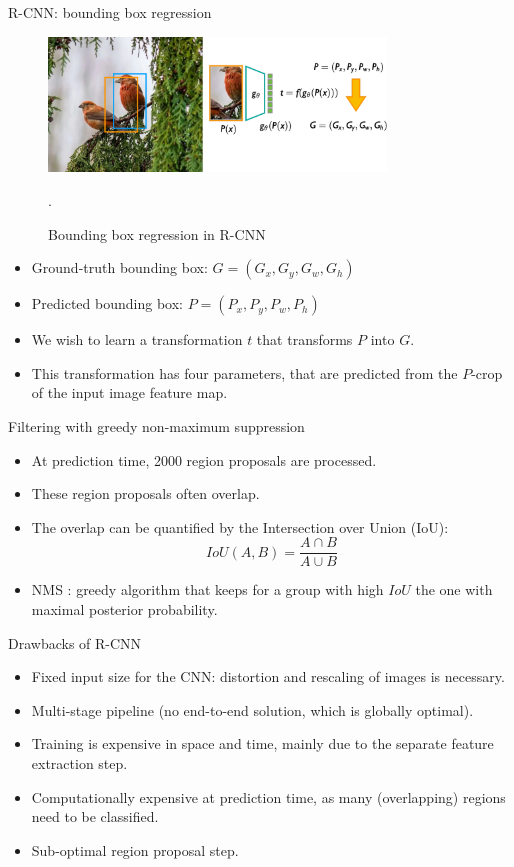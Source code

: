 \documentclass[xcolor=pdftex,dvipsnames,table]{beamer}
\begin{document}
\begin{frame}{R-CNN: bounding box regression}
\begin{figure}[htb]
   \centering
   \includegraphics[width=0.8\textwidth]{../graphics/R-CNN_bb_regression.pdf}
   \caption{Bounding box regression in R-CNN}.
\end{figure}
\begin{itemize}
   \item Ground-truth bounding box: $G=(G_x, G_y, G_w, G_h)$
   \item Predicted bounding box: $P=(P_x, P_y, P_w, P_h)$
   \item We wish to learn a transformation $t$ that transforms $P$ into $G$. 
   \item This transformation has four parameters, that are predicted from the $P$-crop of the input image feature map. 
\end{itemize}
\end{frame}

\begin{frame}{Filtering with greedy non-maximum suppression}
\begin{itemize}
\item At prediction time, 2000 region proposals are processed. 
\item These region proposals often overlap. 
\item The overlap can be quantified by the Intersection over Union (IoU):
\begin{equation*}
IoU(A,B) = \frac{A\cap B}{A\cup B}
\end{equation*}
\item NMS : greedy algorithm that keeps for a group with high $IoU$ the one with maximal posterior probability. 
\end{itemize}
\end{frame}

\begin{frame}{Drawbacks of R-CNN}
\begin{itemize}
\item Fixed input size for the CNN: distortion and rescaling of images is necessary.
\item Multi-stage pipeline (no end-to-end solution, which is globally optimal).
\item Training is expensive in space and time, mainly due to the separate feature extraction step. 
\item Computationally expensive at prediction time, as many (overlapping) regions need to be classified. 
\item Sub-optimal region proposal step.
\end{itemize} 
\end{frame}
\end{document}

